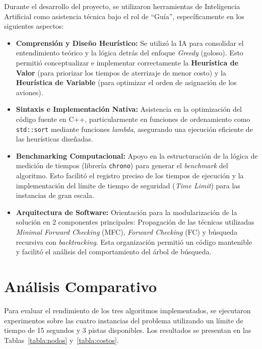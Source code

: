 \documentclass[12pt]{article}
\begin{document}
Durante el desarrollo del proyecto, se utilizaron herramientas de Inteligencia Artificial como asistencia técnica bajo el rol de ``Guía'', específicamente en los siguientes aspectos:
\begin{itemize}
    \item \textbf{Comprensión y Diseño Heurístico:} Se utilizó la IA para consolidar el entendimiento teórico y la lógica detrás del enfoque \textit{Greedy} (goloso). Esto permitió conceptualizar e implementar correctamente la \textbf{Heurística de Valor} (para priorizar los tiempos de aterrizaje de menor costo) y la \textbf{Heurística de Variable} (para optimizar el orden de asignación de los aviones).
    
    \item \textbf{Sintaxis e Implementación Nativa:} Asistencia en la optimización del código fuente en C++, particularmente en funciones de ordenamiento como \texttt{std::sort} mediante funciones \textit{lambda}, asegurando una ejecución eficiente de las heurísticas diseñadas.
    
    \item \textbf{Benchmarking Computacional:} Apoyo en la estructuración de la lógica de medición de tiempos (librería \texttt{chrono}) para generar el \textit{benchmark} del algoritmo. Esto facilitó el registro preciso de los tiempos de ejecución y la implementación del límite de tiempo de seguridad (\textit{Time Limit}) para las instancias de gran escala.
    
    \item \textbf{Arquitectura de Software:} Orientación para la modularización de la solución en 2 componentes principales: Propagación de las técnicas utilizadas \textit{Minimal Forward Checking} (MFC), \textit{Forward Checking} (FC) y búsqueda recursiva con \textit{backtracking}. Esta organización permitió un código mantenible y facilitó el análisis del comportamiento del árbol de búsqueda.
\end{itemize}

\section{Análisis Comparativo}

Para evaluar el rendimiento de los tres algoritmos implementados, se ejecutaron experimentos sobre las cuatro instancias del problema utilizando un límite de tiempo de 15 segundos y 3 pistas disponibles. Los resultados se presentan en las Tablas~\ref{tabla:nodos} y~\ref{tabla:costos}.
\end{document}
